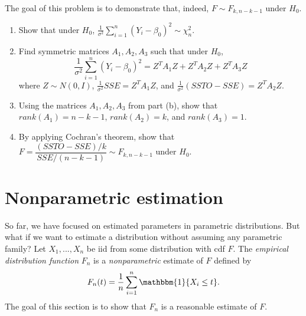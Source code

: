 \documentclass[11pt]{article}
\begin{document}
\begin{enumerate}
The goal of this problem is to demonstrate that, indeed, $F \sim F_{k, n-k-1}$ under $H_0$.

\begin{enumerate}
\item Show that under $H_0$, $\frac{1}{\sigma^2}\sum \limits_{i=1}^n (Y_i - \beta_0)^2 \sim \chi^2_n$.

\item Find symmetric matrices $A_1, A_2, A_3$ such that under $H_0$, 
$$\frac{1}{\sigma^2}\sum \limits_{i=1}^n (Y_i - \beta_0)^2 = Z^T A_1 Z + Z^T A_2 Z + Z^T A_3 Z$$
where $Z \sim N(0, I)$, $\frac{1}{\sigma^2} SSE = Z^T A_1 Z$, and $\frac{1}{\sigma^2} (SSTO - SSE) = Z^T A_2 Z$.

\item Using the matrices $A_1, A_2, A_3$ from part (b), show that $rank(A_1) = n-k-1$, $rank(A_2) = k$, and $rank(A_3) = 1$.

\item By applying Cochran's theorem, show that $F = \dfrac{(SSTO - SSE)/k}{SSE/(n - k - 1)} \sim F_{k, n-k-1}$ under $H_0$.
\end{enumerate}
\end{enumerate}

\section*{Nonparametric estimation}

So far, we have focused on estimated parameters in parametric distributions. But what if we want to estimate a distribution without assuming any parametric family? Let $X_1,...,X_n$ be iid from some distribution with cdf $F$. The \textit{empirical distribution function} $F_n$ is a \textit{nonparametric} estimate of $F$ defined by
$$F_n(t) = \frac{1}{n} \sum \limits_{i=1}^n \mathbbm{1}\{X_i \leq t \}.$$
The goal of this section is to show that $F_n$ is a reasonable estimate of $F$.
\end{document}
